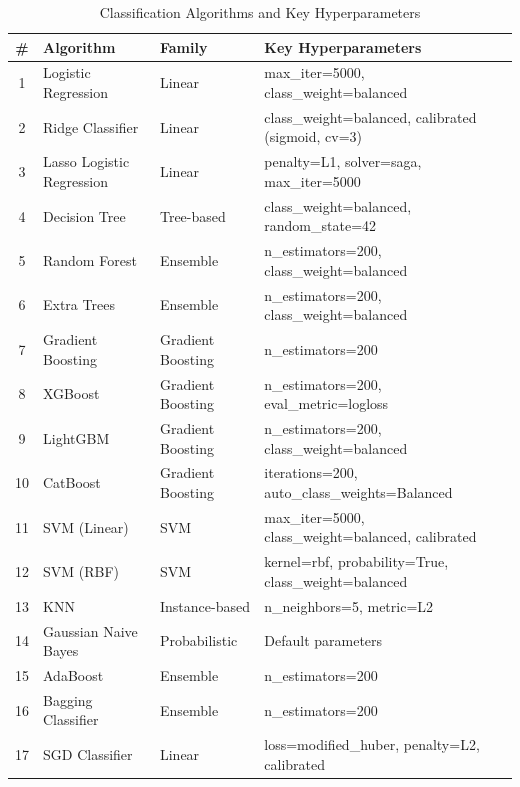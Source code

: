 \documentclass[conference,10pt]{IEEEtran}
\begin{document}
\begin{table}[!t]
\centering
\caption{Classification Algorithms and Key Hyperparameters}
\label{tab:hyperparameters}
\begin{tabular}{clll}
\toprule
\textbf{\#} & \textbf{Algorithm} & \textbf{Family} & \textbf{Key Hyperparameters} \\
\midrule
1  & Logistic Regression       & Linear           & max\_iter=5000, class\_weight=balanced \\
2  & Ridge Classifier          & Linear           & class\_weight=balanced, calibrated (sigmoid, cv=3) \\
3  & Lasso Logistic Regression & Linear           & penalty=L1, solver=saga, max\_iter=5000 \\
4  & Decision Tree             & Tree-based       & class\_weight=balanced, random\_state=42 \\
5  & Random Forest             & Ensemble         & n\_estimators=200, class\_weight=balanced \\
6  & Extra Trees               & Ensemble         & n\_estimators=200, class\_weight=balanced \\
7  & Gradient Boosting         & Gradient Boosting & n\_estimators=200 \\
8  & XGBoost                   & Gradient Boosting & n\_estimators=200, eval\_metric=logloss \\
9  & LightGBM                  & Gradient Boosting & n\_estimators=200, class\_weight=balanced \\
10 & CatBoost                  & Gradient Boosting & iterations=200, auto\_class\_weights=Balanced \\
11 & SVM (Linear)              & SVM              & max\_iter=5000, class\_weight=balanced, calibrated \\
12 & SVM (RBF)                 & SVM              & kernel=rbf, probability=True, class\_weight=balanced \\
13 & KNN                       & Instance-based   & n\_neighbors=5, metric=L2 \\
14 & Gaussian Naive Bayes      & Probabilistic    & Default parameters \\
15 & AdaBoost                  & Ensemble         & n\_estimators=200 \\
16 & Bagging Classifier        & Ensemble         & n\_estimators=200 \\
17 & SGD Classifier            & Linear           & loss=modified\_huber, penalty=L2, calibrated \\

\end{tabular}
\end{table}
\end{document}
